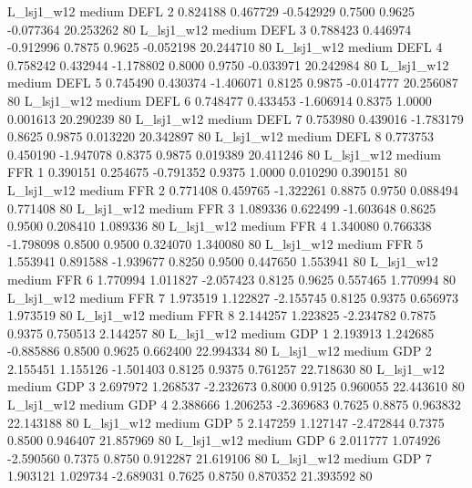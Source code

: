     L_lsj1_w12     medium     DEFL                 2  0.824188 0.467729 -0.542929 0.7500 0.9625 -0.077364   20.253262 80
    L_lsj1_w12     medium     DEFL                 3  0.788423 0.446974 -0.912996 0.7875 0.9625 -0.052198   20.244710 80
    L_lsj1_w12     medium     DEFL                 4  0.758242 0.432944 -1.178802 0.8000 0.9750 -0.033971   20.242984 80
    L_lsj1_w12     medium     DEFL                 5  0.745490 0.430374 -1.406071 0.8125 0.9875 -0.014777   20.256087 80
    L_lsj1_w12     medium     DEFL                 6  0.748477 0.433453 -1.606914 0.8375 1.0000  0.001613   20.290239 80
    L_lsj1_w12     medium     DEFL                 7  0.753980 0.439016 -1.783179 0.8625 0.9875  0.013220   20.342897 80
    L_lsj1_w12     medium     DEFL                 8  0.773753 0.450190 -1.947078 0.8375 0.9875  0.019389   20.411246 80
    L_lsj1_w12     medium      FFR                 1  0.390151 0.254675 -0.791352 0.9375 1.0000  0.010290    0.390151 80
    L_lsj1_w12     medium      FFR                 2  0.771408 0.459765 -1.322261 0.8875 0.9750  0.088494    0.771408 80
    L_lsj1_w12     medium      FFR                 3  1.089336 0.622499 -1.603648 0.8625 0.9500  0.208410    1.089336 80
    L_lsj1_w12     medium      FFR                 4  1.340080 0.766338 -1.798098 0.8500 0.9500  0.324070    1.340080 80
    L_lsj1_w12     medium      FFR                 5  1.553941 0.891588 -1.939677 0.8250 0.9500  0.447650    1.553941 80
    L_lsj1_w12     medium      FFR                 6  1.770994 1.011827 -2.057423 0.8125 0.9625  0.557465    1.770994 80
    L_lsj1_w12     medium      FFR                 7  1.973519 1.122827 -2.155745 0.8125 0.9375  0.656973    1.973519 80
    L_lsj1_w12     medium      FFR                 8  2.144257 1.223825 -2.234782 0.7875 0.9375  0.750513    2.144257 80
    L_lsj1_w12     medium      GDP                 1  2.193913 1.242685 -0.885886 0.8500 0.9625  0.662400   22.994334 80
    L_lsj1_w12     medium      GDP                 2  2.155451 1.155126 -1.501403 0.8125 0.9375  0.761257   22.718630 80
    L_lsj1_w12     medium      GDP                 3  2.697972 1.268537 -2.232673 0.8000 0.9125  0.960055   22.443610 80
    L_lsj1_w12     medium      GDP                 4  2.388666 1.206253 -2.369683 0.7625 0.8875  0.963832   22.143188 80
    L_lsj1_w12     medium      GDP                 5  2.147259 1.127147 -2.472844 0.7375 0.8500  0.946407   21.857969 80
    L_lsj1_w12     medium      GDP                 6  2.011777 1.074926 -2.590560 0.7375 0.8750  0.912287   21.619106 80
    L_lsj1_w12     medium      GDP                 7  1.903121 1.029734 -2.689031 0.7625 0.8750  0.870352   21.393592 80
